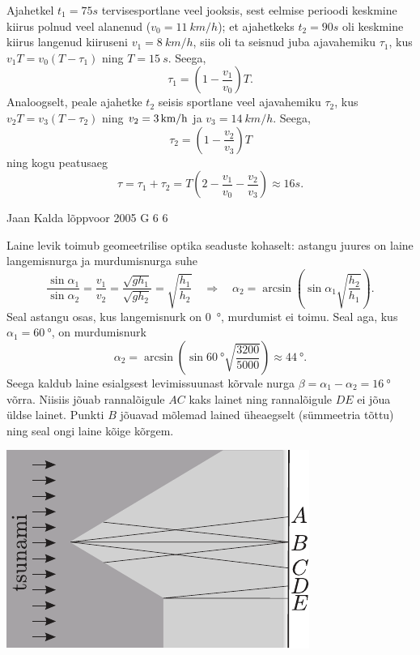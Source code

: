 \documentclass[11pt]{article}
\begin{document}
{{\ifSolution
Ajahetkel $t_1=\SI{75}s$ tervisesportlane veel jooksis, sest eelmise perioodi keskmine kiirus polnud veel alanenud ($v_0=\SI{11}{km/h}$);
et ajahetkeks $t_2=\SI {90}s$ oli keskmine kiirus langenud kiiruseni $v_1=\SI{8}{km/h}$, siis oli ta seisnud juba ajavahemiku
$\tau_1$, kus $v_1 T= v_0 (T-\tau_1)$ ning $T=\SI{15}{s}$. Seega, 
\[
\tau_1=\left(1-\frac{v_1}{v_0}\right)T.
\]
Analoogselt, peale ajahetke $t_2$ seisis
sportlane veel ajavahemiku $\tau_2$, kus $v_2 T= v_3 (T-\tau_2)$ ning $v_2=\SI 3{km/h}$ ja $v_3=\SI{14}{km/h}$. Seega, 
\[
\tau_2=\left(1-\frac{v_2}{v_3}\right)T
\]
ning kogu peatusaeg
\[
\tau=\tau_1+\tau_2=T\left(2-\frac{v_1}{v_0}- \frac{v_2}{v_3}\right)\approx \SI{16}s.
\]
\fi
}

{Jaan Kalda} %
{lõppvoor} %
{2005} %
{G 6} %
{6} %
{

\ifSolution
Laine levik toimub geomeetrilise optika seaduste kohaselt: astangu juures on laine langemisnurga ja murdumisnurga suhe
\[
\frac{\sin \alpha_{1}}{\sin \alpha_{2}}=\frac{v_{1}}{v_{2}}=\frac{\sqrt{g h_{1}}}{\sqrt{g h_{2}}}=\sqrt{\frac{h_{1}}{h_{2}}} \quad\Rightarrow\quad \alpha_{2}=\arcsin \left(\sin \alpha_{1} \sqrt{\frac{h_{2}}{h_{1}}}\right).
\]
Seal astangu osas, kus langemisnurk on \SI{0}{\degree}, murdumist ei toimu. Seal aga, kus $\alpha_1 = \SI{60}{\degree}$, on murdumisnurk
\[
\alpha_{2}=\arcsin \left(\sin \SI{60}{\degree} \sqrt{\frac{3200}{5000}}\right) \approx \SI{44}{\degree}.
\]
Seega kaldub laine esialgsest levimissuunast kõrvale nurga $\beta = \alpha_1 -\alpha_2 = \SI{16}{\degree}$ võrra. Niisiis jõuab rannalõigule $AC$ kaks lainet ning rannalõigule $DE$ ei jõua üldse lainet. Punkti $B$ jõuavad mõlemad lained üheaegselt (sümmeetria tõttu) ning seal ongi laine kõige kõrgem.

\begin{center}
	\includegraphics[width=0.6\linewidth]{2005-v3g-06-lah}
\end{center}
\fi
}

}
\end{document}
